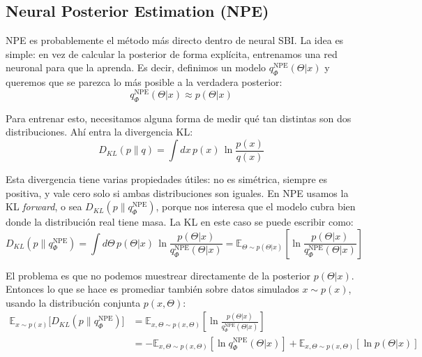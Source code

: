 \subsection{Neural Posterior Estimation (NPE)}

NPE es probablemente el método más directo dentro de neural SBI. La idea es simple: en vez de calcular la posterior de forma explícita, entrenamos una red neuronal para que la aprenda. Es decir, definimos un modelo $q_{\Phi}^{\text{NPE}}(\Theta|x)$ y queremos que se parezca lo más posible a la verdadera posterior:
\begin{equation}
q_{\Phi}^{\text{NPE}}(\Theta|x) \approx p(\Theta|x)
\end{equation}

Para entrenar esto, necesitamos alguna forma de medir qué tan distintas son dos distribuciones. Ahí entra la divergencia KL:
\begin{equation}
D_{KL}(p \| q) = \int dx \, p(x)\, \ln \frac{p(x)}{q(x)}
\end{equation}

Esta divergencia tiene varias propiedades útiles: no es simétrica, siempre es positiva, y vale cero solo si ambas distribuciones son iguales. En NPE usamos la KL \textit{forward}, o sea $D_{KL}(p \| q_{\Phi}^{\text{NPE}})$, porque nos interesa que el modelo cubra bien donde la distribución real tiene masa. La KL en este caso se puede escribir como:
\begin{equation}
D_{KL}(p \| q_{\Phi}^{\text{NPE}}) 
= \int d\Theta \, p(\Theta|x)\, \ln \frac{p(\Theta|x)}{q_{\Phi}^{\text{NPE}}(\Theta|x)}
= \mathbb{E}_{\Theta \sim p(\Theta|x)} 
\left[ \ln \frac{p(\Theta|x)}{q_{\Phi}^{\text{NPE}}(\Theta|x)} \right]
\end{equation}

El problema es que no podemos muestrear directamente de la posterior $p(\Theta|x)$. Entonces lo que se hace es promediar también sobre datos simulados $x \sim p(x)$, usando la distribución conjunta $p(x,\Theta)$:
\begin{align}
\mathbb{E}_{x \sim p(x)}\big[ D_{KL}(p \| q_{\Phi}^{\text{NPE}}) \big]
&= \mathbb{E}_{x,\Theta \sim p(x,\Theta)} 
\left[ \ln \frac{p(\Theta|x)}{q_{\Phi}^{\text{NPE}}(\Theta|x)} \right] \\
&= - \mathbb{E}_{x,\Theta \sim p(x,\Theta)} 
\left[ \ln q_{\Phi}^{\text{NPE}}(\Theta|x) \right]
+ \mathbb{E}_{x,\Theta \sim p(x,\Theta)} 
\left[ \ln p(\Theta|x) \right] 
\end{align}

